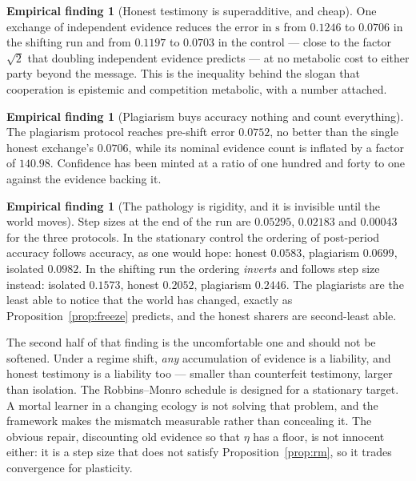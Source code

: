 \documentclass[11pt,a4paper]{article}
\theoremstyle{plain}
\theoremstyle{definition}
\newtheorem{finding}[theorem]{Empirical finding}
\theoremstyle{remark}
\newcommand{\str}{\mathrm{s}}
\begin{document}
\begin{finding}[Honest testimony is superadditive, and cheap]\label{find:honest}
One exchange of independent evidence reduces the error in $\str$ from $0.1246$ to
$0.0706$ in the shifting run and from $0.1197$ to $0.0703$ in the control ---
close to the factor $\sqrt{2}$ that doubling independent evidence predicts --- at
no metabolic cost to either party beyond the message. This is the inequality
behind the slogan that cooperation is epistemic and competition metabolic, with a
number attached.
\end{finding}

\begin{finding}[Plagiarism buys accuracy nothing and count everything]
\label{find:plagiarism}
The plagiarism protocol reaches pre-shift error $0.0752$, no better than the
single honest exchange's $0.0706$, while its nominal evidence count is inflated
by a factor of $140.98$. Confidence has been minted at a ratio of one hundred and
forty to one against the evidence backing it.
\end{finding}

\begin{finding}[The pathology is rigidity, and it is invisible until the world
moves]\label{find:rigid}
Step sizes at the end of the run are $0.05295$, $0.02183$ and $0.00043$ for the
three protocols. In the stationary control the ordering of post-period accuracy
follows accuracy, as one would hope: honest $0.0583$, plagiarism $0.0699$,
isolated $0.0982$. In the shifting run the ordering \emph{inverts} and follows
step size instead: isolated $0.1573$, honest $0.2052$, plagiarism $0.2446$. The
plagiarists are the least able to notice that the world has changed, exactly as
Proposition~\ref{prop:freeze} predicts, and the honest sharers are second-least
able.
\end{finding}

The second half of that finding is the uncomfortable one and should not be
softened. Under a regime shift, \emph{any} accumulation of evidence is a
liability, and honest testimony is a liability too --- smaller than counterfeit
testimony, larger than isolation. The Robbins--Monro schedule is designed for a
stationary target. A mortal learner in a changing ecology is not solving that
problem, and the framework makes the mismatch measurable rather than concealing
it. The obvious repair, discounting old evidence so that $\eta$ has a floor, is
not innocent either: it is a step size that does not satisfy
Proposition~\ref{prop:rm}, so it trades convergence for plasticity.
\end{document}

